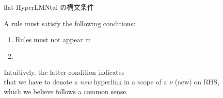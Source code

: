 \begin{frame}{flat HyperLMNtal の構文条件}

  A rule  must satisfy the following conditions:

  \begin{enumerate}
  \item Rules must not appear in 
  \item {}
  \end{enumerate}

  \vspace{2em}
  
  Intuitively, the latter condition indicates\\
  that we have to denote a \emph{new} hyperlink in a scope of a \(\nu\) (new) on RHS,\\
  which we believe follows a common sense.
    
\end{frame}


